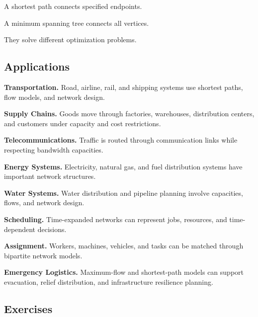 A shortest path connects specified endpoints.

A minimum spanning tree connects all vertices.

They solve different optimization problems.

\subsection{Applications}
\label{subsec:network-optimization-applications}

\begin{applicationbox}

\textbf{Transportation.}
Road, airline, rail, and shipping systems use shortest paths, flow models,
and network design.

\medskip

\textbf{Supply Chains.}
Goods move through factories, warehouses, distribution centers, and
customers under capacity and cost restrictions.

\medskip

\textbf{Telecommunications.}
Traffic is routed through communication links while respecting bandwidth
capacities.

\medskip

\textbf{Energy Systems.}
Electricity, natural gas, and fuel distribution systems have important
network structures.

\medskip

\textbf{Water Systems.}
Water distribution and pipeline planning involve capacities, flows, and
network design.

\medskip

\textbf{Scheduling.}
Time-expanded networks can represent jobs, resources, and time-dependent
decisions.

\medskip

\textbf{Assignment.}
Workers, machines, vehicles, and tasks can be matched through bipartite
network models.

\medskip

\textbf{Emergency Logistics.}
Maximum-flow and shortest-path models can support evacuation, relief
distribution, and infrastructure resilience planning.

\end{applicationbox}

\subsection{Exercises}
\label{subsec:network-optimization-exercises}

